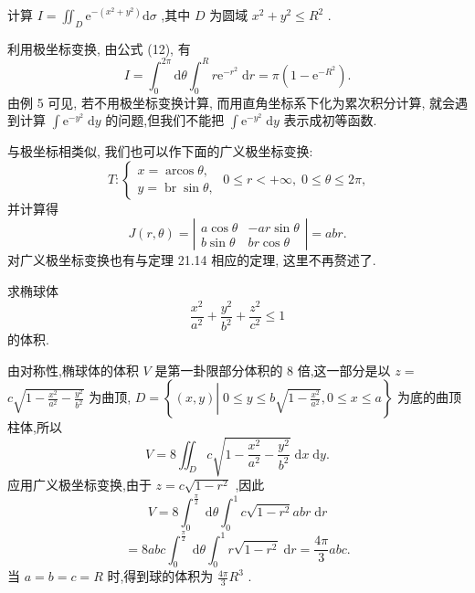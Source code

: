 \begin{example}

\end{example}
计算 \(I = {\iint }_{D}{\mathrm{e}}^{-\left( {{x}^{2} + {y}^{2}}\right) }\mathrm{d}\sigma\) ,其中 \(D\) 为圆域 \({x}^{2} + {y}^{2} \leq  {R}^{2}\) .

\begin{solution}

\end{solution}
利用极坐标变换, 由公式 (12), 有
\[
I = {\int }_{0}^{2\pi }\mathrm{d}\theta {\int }_{0}^{R}r{\mathrm{e}}^{-{r}^{2}}\mathrm{\;d}r = \pi \left( {1 - {\mathrm{e}}^{-{R}^{2}}}\right) .
\]
由例 5 可见, 若不用极坐标变换计算, 而用直角坐标系下化为累次积分计算, 就会遇到计算 \(\int {\mathrm{e}}^{-{y}^{2}}\mathrm{\;d}y\) 的问题,但我们不能把 \(\int {\mathrm{e}}^{-{y}^{2}}\mathrm{\;d}y\) 表示成初等函数.

与极坐标相类似, 我们也可以作下面的广义极坐标变换:
\[
T : \left\{  {\begin{array}{l} x = \operatorname{arcos}\theta , \\  y = \operatorname{br}\sin \theta , \end{array}\;0 \leq  r <  + \infty ,\;0 \leq  \theta  \leq  {2\pi },}\right.
\]
并计算得
\[
J\left( {r,\theta }\right)  = \left| \begin{array}{rr} a\cos \theta &  - {ar}\sin \theta \\  b\sin \theta & {br}\cos \theta  \end{array}\right|  = {abr}.
\]
对广义极坐标变换也有与定理 21.14 相应的定理, 这里不再赘述了.

\begin{example}

\end{example}
求椭球体
\[
\frac{{x}^{2}}{{a}^{2}} + \frac{{y}^{2}}{{b}^{2}} + \frac{{z}^{2}}{{c}^{2}} \leq  1
\]
的体积.

\begin{solution}

\end{solution}
由对称性,椭球体的体积 \(V\) 是第一卦限部分体积的 8 倍,这一部分是以 \(z =\)  \(c\sqrt{1 - \frac{{x}^{2}}{{a}^{2}} - \frac{{y}^{2}}{{b}^{2}}}\) 为曲顶, \(D = \left\{  {\left( {x,y}\right) \left| {\;0 \leq  y \leq  b\sqrt{1 - \frac{{x}^{2}}{{a}^{2}}}}\right. ,0 \leq  x \leq  a}\right\}\) 为底的曲顶柱体,所以
\[
V = 8{\iint }_{D}c\sqrt{1 - \frac{{x}^{2}}{{a}^{2}} - \frac{{y}^{2}}{{b}^{2}}}\mathrm{\;d}x\mathrm{\;d}y.
\]
应用广义极坐标变换,由于 \(z = c\sqrt{1 - {r}^{2}}\) ,因此
\[
V = 8{\int }_{0}^{\frac{\pi }{2}}\mathrm{\;d}\theta {\int }_{0}^{1}c\sqrt{1 - {r}^{2}}{abr}\mathrm{\;d}r
\]
\[
= {8abc}{\int }_{0}^{\frac{\pi }{2}}\mathrm{\;d}\theta {\int }_{0}^{1}r\sqrt{1 - {r}^{2}}\mathrm{\;d}r = \frac{4\pi }{3}{abc}.
\]
当 \(a = b = c = R\) 时,得到球的体积为 \(\frac{4\pi }{3}{R}^{3}\) .

